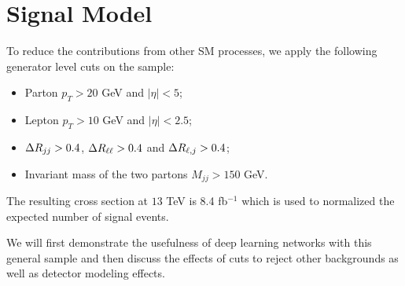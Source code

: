\section{\label{sec:signal} Signal Model}
To reduce the contributions from other SM processes, we apply the following generator level cuts on the \ssWW sample: 
\begin{itemize}
\item Parton $p_T > 20$ GeV and $|\eta| < 5$;
\item Lepton $p_T > 10$ GeV and $|\eta| < 2.5$;
\item $ \Delta R _{jj}>0.4$, $ \Delta R _{\ell \ell}>0.4$ and $ \Delta R _{\ell, j} > 0.4$;
\item Invariant mass of the two partons $M_{jj}> 150$ GeV.
\end{itemize}
The resulting cross section at $13$ TeV is 8.4 fb$^{-1}$ which is used to normalized the expected number of signal events.

We will first demonstrate the usefulness of deep learning networks with this general sample and then discuss the effects of cuts 
to reject other backgrounds as well as detector modeling effects. 


